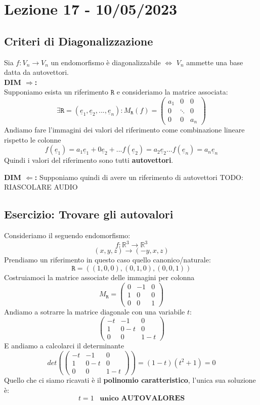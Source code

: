 \section{Lezione 17 - 10/05/2023}

\subsection{Criteri di Diagonalizzazione}
Sia $f: V_n \rightarrow V_n$ un endomorfismo è diagonalizzabile $\Leftrightarrow$ $V_n$ ammette una base datta da autovettori.\\
\textbf{DIM $\Rightarrow$:}\\
Supponiamo esista un riferimento $\mathtt{R}$ e consideriamo la matrice associata:
$$ 
\exists \mathtt{R}=(\underline{e}_1,\underline{e}_2,...,\underline{e}_n): M_{\mathtt{R}}(f) = \begin{pmatrix}
a_1 & 0 & 0 \\
0 & \ddots & 0 \\
0 & 0 & a_n
\end{pmatrix}
$$
Andiamo fare l'immagini dei valori del riferimento come combinazione lineare rispetto le colonne
$$ 
f(\underline{e}_1) = a_1\underline{e}_1 + 0\underline{e}_2 + ...
f(\underline{e}_2) = a_2\underline{e}_2
...
f(\underline{e}_n) = a_n\underline{e}_n
$$
Quindi i valori del riferimento sono tutti \textbf{autovettori}.

\textbf{DIM $\Leftarrow$:}
Supponiamo quindi di avere un riferimento di autovettori
TODO: RIASCOLARE AUDIO


\subsection{Esercizio: Trovare gli autovalori}
Consideriamo il seguendo endomorfismo:
$$ f:\mathbb{R}^3 \rightarrow \mathbb{R}^3  $$
$$ (x,y,z) \rightarrow (-y,x,z) $$
Prendiamo un riferimento in questo caso quello canonico/naturale:
$$ \mathtt{R} = ((1,0,0),(0,1,0),(0,0,1)) $$
Costruiamoci la matrice associate delle immagini per colonna
$$ 
M_{\mathtt{R}} = \begin{pmatrix}
0 & -1 & 0 \\ 1 & 0 & 0 \\ 0 & 0 & 1 
\end{pmatrix}
$$
Andiamo a sotrarre la matrice diagonale con una variabile $t$:
$$ 
\begin{pmatrix}
-t & -1 & 0 \\ 1 & 0-t & 0 \\ 0 & 0 & 1-t 
\end{pmatrix}
$$
E andiamo a calcolarci il determinante 
$$ 
det (\begin{pmatrix}
-t & -1 & 0 \\ 1 & 0-t & 0 \\ 0 & 0 & 1-t 
\end{pmatrix}) 
= (1-t)(t^2+1) = 0
$$
Quello che ci siamo ricavati è il \textbf{polinomio caratteristico}, l'unica sua soluzione è:
$$ t = 1 \;\;\; \textbf{unico AUTOVALORES}$$

